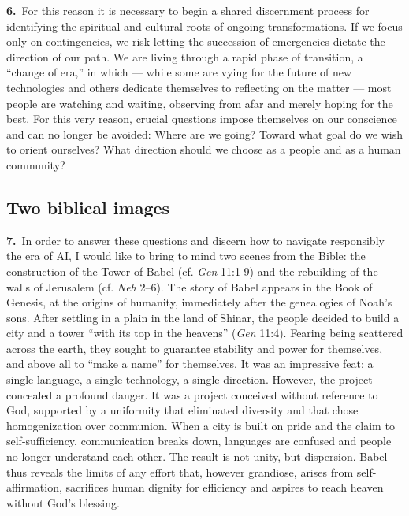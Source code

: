 \documentclass{article}
\begin{document}
\textbf{6.}\ For this reason it is necessary to begin a shared discernment process for identifying the spiritual and cultural roots of ongoing transformations. If we focus only on contingencies, we risk letting the succession of emergencies dictate the direction of our path. We are living through a rapid phase of transition, a ``change of era,'' in which --- while some are vying for the future of new technologies and others dedicate themselves to reflecting on the matter --- most people are watching and waiting, observing from afar and merely hoping for the best. For this very reason, crucial questions impose themselves on our conscience and can no longer be avoided: Where are we going? Toward what goal do we wish to orient ourselves? What direction should we choose as a people and as a human community?

\subsection{Two biblical images}

\textbf{7.}\ In order to answer these questions and discern how to navigate responsibly the era of AI, I would like to bring to mind two scenes from the Bible: the construction of the Tower of Babel (cf. \emph{Gen} 11:1-9) and the rebuilding of the walls of Jerusalem (cf. \emph{Neh} 2--6). The story of Babel appears in the Book of Genesis, at the origins of humanity, immediately after the genealogies of Noah's sons. After settling in a plain in the land of Shinar, the people decided to build a city and a tower ``with its top in the heavens'' (\emph{Gen} 11:4). Fearing being scattered across the earth, they sought to guarantee stability and power for themselves, and above all to ``make a name'' for themselves. It was an impressive feat: a single language, a single technology, a single direction. However, the project concealed a profound danger. It was a project conceived without reference to God, supported by a uniformity that eliminated diversity and that chose homogenization over communion. When a city is built on pride and the claim to self-sufficiency, communication breaks down, languages are confused and people no longer understand each other. The result is not unity, but dispersion. Babel thus reveals the limits of any effort that, however grandiose, arises from self-affirmation, sacrifices human dignity for efficiency and aspires to reach heaven without God's blessing.
\end{document}

